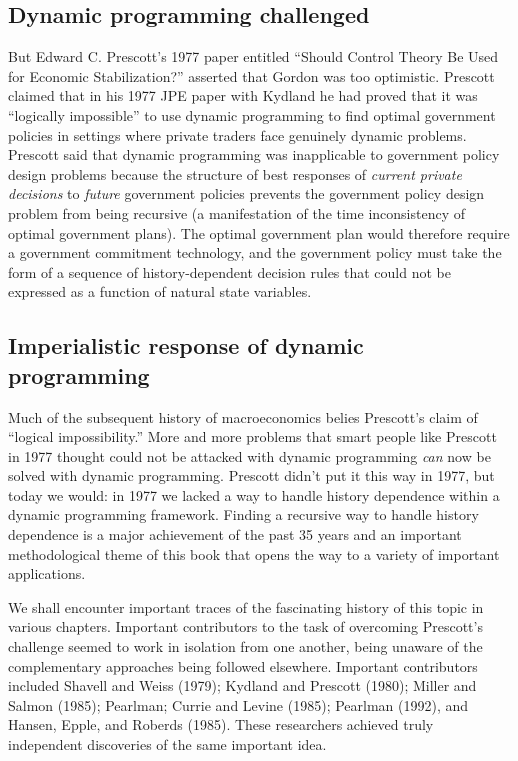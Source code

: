 \subsection{Dynamic programming  challenged}
But Edward C.
 Prescott's 1977 paper
entitled ``Should Control  Theory Be Used for Economic Stabilization?''
asserted that Gordon was too optimistic.
Prescott
claimed that in his 1977 JPE paper with
Kydland he had proved that
it was ``logically impossible'' to use dynamic programming to  find
optimal government policies in settings where  private traders
face genuinely dynamic problems.  Prescott
said that  dynamic programming was inapplicable to government policy
design problems because the structure of
best responses of {\it current private decisions\/} to {\it future\/}
government policies prevents the government policy design problem from
being recursive (a
manifestation of the time inconsistency of optimal government plans).
The optimal government plan would therefore require a  government
commitment technology, and the government policy
must take the form of a sequence of history-dependent
decision rules that could not be expressed as a function
of natural state variables.

\subsection{Imperialistic response of dynamic   programming}

Much of the subsequent history of macroeconomics
belies
Prescott's claim of ``logical impossibility.''
  More and more problems that smart
people like Prescott in 1977 thought could not be attacked
with dynamic programming {\it can\/} now   be solved with
dynamic programming.
Prescott didn't put it this way in 1977, but today we would:
in 1977 we lacked a way to handle history dependence
 within  a dynamic programming framework.
Finding a recursive way to
handle history dependence  is a major achievement of the past 35 years
and an important methodological theme of this book that opens
the way to a variety of important applications.

We shall encounter important traces of
the fascinating history of this topic in various chapters.  Important
contributors to the task of overcoming Prescott's challenge seemed to work in isolation
from one another, being unaware of the complementary approaches
being followed elsewhere. Important contributors included
 Shavell and Weiss (1979);
Kydland and Prescott (1980); Miller and Salmon (1985); Pearlman;
Currie and Levine (1985); Pearlman (1992), and Hansen, Epple, and
Roberds (1985). These researchers achieved truly independent
discoveries of the same important idea. 
 
 


